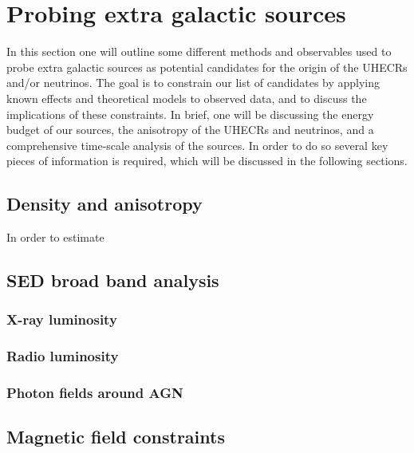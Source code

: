 \section{Probing extra galactic sources}

In this section one will outline some different methods and observables used to probe extra galactic sources as potential candidates for the origin of the UHECRs and/or neutrinos. The goal is to constrain our list of candidates by applying known effects and theoretical models to observed data, and to discuss the implications of these constraints. In brief, one will be discussing the energy budget of our sources, the anisotropy of the UHECRs and neutrinos, and a comprehensive time-scale analysis of the sources. In order to do so several key pieces of information is required, which will be discussed in the following sections.


\subsection{Density and anisotropy}

In order to estimate 

\subsection{SED broad band analysis}
\subsubsection{X-ray luminosity}
\subsubsection{Radio luminosity}
\subsubsection{Photon fields around AGN}


\subsection{Magnetic field constraints}

